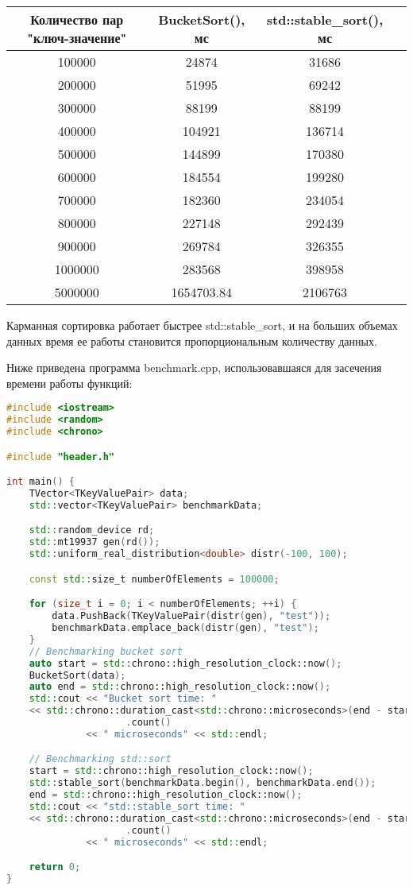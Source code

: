 \documentclass[12pt]{article}
\begin{document}
\begin{center}
\begin{tabular}{ |c|c|c|c| }
    \hline
    Количество пар "ключ-значение" & BucketSort(), мс & std::stable\_sort(), мс  \\
    \hline
    100000 & 24874 & 31686   \\
    200000 & 51995 & 69242   \\
    300000 & 88199 & 88199   \\
    400000 & 104921 & 136714  \\
    500000 & 144899 & 170380  \\
    600000 & 184554 & 199280   \\
    700000 & 182360 & 234054   \\
    800000 & 227148 & 292439   \\
    900000 & 269784 & 326355   \\
    1000000 & 283568 & 398958  \\
    5000000 & 1654703.84 & 2106763 \\


    \hline
    \end{tabular}
\end{center}

Карманная сортировка работает быстрее std::stable\_sort, и на больших объемах данных время ее работы становится пропорциональным 
количеству данных.

Ниже приведена программа benchmark.cpp, использовавшаяся для засечения времени работы функций:
\begin{lstlisting}[language=C++]
#include <iostream>
#include <random>
#include <chrono>

#include "header.h"

int main() {
    TVector<TKeyValuePair> data;
    std::vector<TKeyValuePair> benchmarkData;

    std::random_device rd;
    std::mt19937 gen(rd());
    std::uniform_real_distribution<double> distr(-100, 100);

    const std::size_t numberOfElements = 100000;

    for (size_t i = 0; i < numberOfElements; ++i) {
        data.PushBack(TKeyValuePair(distr(gen), "test"));
        benchmarkData.emplace_back(distr(gen), "test");
    }
    // Benchmarking bucket sort
    auto start = std::chrono::high_resolution_clock::now();
    BucketSort(data);
    auto end = std::chrono::high_resolution_clock::now();
    std::cout << "Bucket sort time: "
    << std::chrono::duration_cast<std::chrono::microseconds>(end - start)
                     .count()
              << " microseconds" << std::endl;

    // Benchmarking std::sort
    start = std::chrono::high_resolution_clock::now();
    std::stable_sort(benchmarkData.begin(), benchmarkData.end());
    end = std::chrono::high_resolution_clock::now();
    std::cout << "std::stable_sort time: "
    << std::chrono::duration_cast<std::chrono::microseconds>(end - start)
                     .count()
              << " microseconds" << std::endl;

    return 0;
}

\end{lstlisting}
\end{document}
